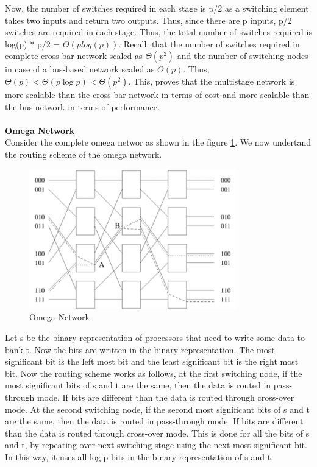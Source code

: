 \documentclass[12pt]{article}
\begin{document}
Now, the number of switches required in each stage is p/2 as a switching element takes two inputs and return two outputs. Thus, 
since there are p inputs, p/2 switches are required in each stage. Thus, the total number of switches required is log(p) * p/2 = $\Theta(plog(p))$.
Recall, that the number of switches required in complete cross bar network scaled as $\Theta(p^2)$ and the number of switching nodes in case of a bus-based network
scaled as $\Theta(p)$. Thus, $\Theta(p)<\Theta(p \log p)<\Theta(p^2)$. This, proves that the 
multistage network is more scalable than the cross bar network in terms of cost and more scalable than the bus network in terms of performance. \\
\\
\textbf{Omega Network}\\
Consider the complete omega networ as shown in the figure \ref{fig:omega}.
We now undertand the routing scheme of the omega network.
\begin{figure}[H]
    \centering
    \includegraphics[width=0.8\textwidth]{images/omega.png}
    \caption{Omega Network}
    \label{fig:omega}
\end{figure}
Let s be the binary representation of processors that need to write some data to bank t.
Now the bits are written in the binary representation. The most significant bit is the left most bit and the least 
significant bit is the right most bit. Now the routing scheme works as follows, at the first switching node, if the most
significant bits of s and t are the same, then the data is routed in pass-through mode. If bits are different than the data is routed through
cross-over mode. At the second switching node, if the second most significant bits of s and t are the same, then the data is routed in pass-through mode.
If bits are different than the data is routed through cross-over mode. This is done for all the bits of s and t, by repeating over 
next switching stage using the next most significant bit. In this way, it uses all log p bits in the binary representation of s and t.
\end{document}

